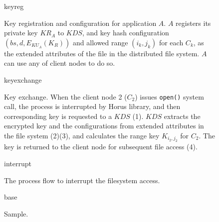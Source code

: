 \documentclass{article}
\def\gpicbox#1{%
\vbox{\unvbox\csname #1\endcsname\kern 0pt}}
\newcommand{\gpicfig}[2]{%

\begin{figure}
\begin{center}
\leavevmode
\gpicbox{#1}
\caption{#2}
\label{fig:#1}
\end{center}
\end{figure}
}
\begin{document}
\gpicfig{keyreg}{Key registration and configuration for application $A$.
$A$ registers its private key $KR_A$ to $KDS$, and key hash configuration
$(bs,d,E_{KU_A}(K_R))$ and allowed range $(i_k,j_k)$ for each $C_k$,
as the extended attributes of the file in the distributed file system.
$A$ can use any of client nodes to do so.}

\gpicfig{keyexchange}{Key exchange. When the client node 2 ($C_2$) issues
\texttt{open()} system call, the process is interrupted by Horus library,
and then corresponding key is requested to a $KDS$ (1).
$KDS$ extracts the encrypted key and the configurations from extended
attributes in the file system (2)(3), and calculates the range key
$K_{i_2,j_2}$ for $C_2$. The key is returned to the client node for
subsequent file access (4).}

\gpicfig{interrupt}{The process flow to interrupt the filesystem access.}

\gpicfig{base}{Sample.}
\end{document}
